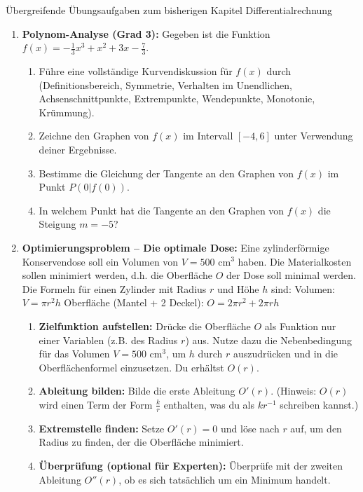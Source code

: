 \begin{aufgabenumgebung}[A:DiffUebergreifend]{Übergreifende Übungsaufgaben zum bisherigen Kapitel Differentialrechnung}
\begin{enumerate}
    \item \textbf{Polynom-Analyse (Grad 3):}
        Gegeben ist die Funktion $f(x) = -\frac{1}{3}x^3 + x^2 + 3x - \frac{7}{3}$.
        \begin{enumerate}
            \item Führe eine vollständige Kurvendiskussion für $f(x)$ durch (Definitionsbereich, Symmetrie, Verhalten im Unendlichen, Achsenschnittpunkte, Extrempunkte, Wendepunkte, Monotonie, Krümmung).
            \item Zeichne den Graphen von $f(x)$ im Intervall $[-4, 6]$ unter Verwendung deiner Ergebnisse.
            \item Bestimme die Gleichung der Tangente an den Graphen von $f(x)$ im Punkt $P(0|f(0))$.
            \item In welchem Punkt hat die Tangente an den Graphen von $f(x)$ die Steigung $m=-5$?
        \end{enumerate}
    \item \textbf{Optimierungsproblem – Die optimale Dose:}
        Eine zylinderförmige Konservendose soll ein Volumen von $V = 500 \text{ cm}^3$ haben. Die Materialkosten sollen minimiert werden, d.h. die Oberfläche $O$ der Dose soll minimal werden.
        Die Formeln für einen Zylinder mit Radius $r$ und Höhe $h$ sind:
        Volumen: $V = \pi r^2 h$
        Oberfläche (Mantel + 2 Deckel): $O = 2\pi r^2 + 2\pi r h$
        \begin{enumerate}
            \item \textbf{Zielfunktion aufstellen:} Drücke die Oberfläche $O$ als Funktion nur einer Variablen (z.B. des Radius $r$) aus. Nutze dazu die Nebenbedingung für das Volumen $V=500 \text{ cm}^3$, um $h$ durch $r$ auszudrücken und in die Oberflächenformel einzusetzen. Du erhältst $O(r)$.
            \item \textbf{Ableitung bilden:} Bilde die erste Ableitung $O'(r)$. (Hinweis: $O(r)$ wird einen Term der Form $\frac{k}{r}$ enthalten, was du als $kr^{-1}$ schreiben kannst.)
            \item \textbf{Extremstelle finden:} Setze $O'(r)=0$ und löse nach $r$ auf, um den Radius zu finden, der die Oberfläche minimiert.
            \item \textbf{Überprüfung (optional für Experten):} Überprüfe mit der zweiten Ableitung $O''(r)$, ob es sich tatsächlich um ein Minimum handelt.

\end{enumerate}
\end{enumerate}
\end{aufgabenumgebung}
